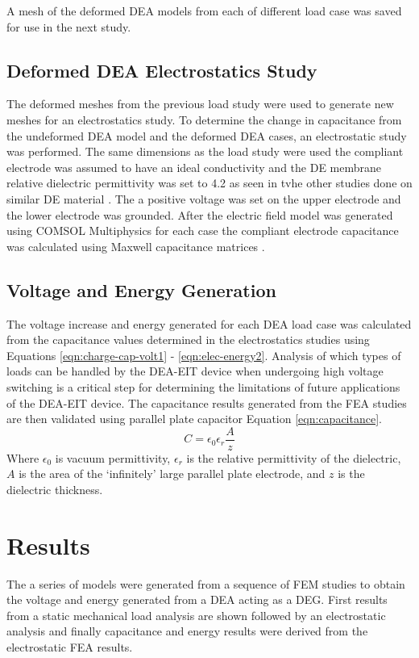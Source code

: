 A mesh of the deformed DEA models from each of different load case was saved for use in the next study.


\subsection{Deformed DEA Electrostatics Study}
The deformed meshes from the previous load study were used to generate new meshes for an electrostatics study. To determine the change in capacitance from the undeformed DEA model and the deformed DEA cases, an electrostatic study was performed. The same dimensions as the load study were used the compliant electrode was assumed to have an ideal conductivity and the DE membrane relative dielectric permittivity was set to 4.2 as seen in tvhe other studies done on similar DE material \cite{Pan2015}. The a positive voltage was set on the upper electrode and the lower electrode was grounded. After the electric field model was generated using COMSOL Multiphysics \cite{COMSOL2022} for each case the compliant electrode capacitance was calculated using Maxwell capacitance matrices \cite{Smolic2021} . 


\subsection{Voltage and Energy Generation}
The voltage increase and energy generated for each DEA load case was calculated from the capacitance values determined in the electrostatics studies using Equations \ref{eqn:charge-cap-volt1} - \ref{eqn:elec-energy2}. Analysis of which types of loads can be handled by the DEA-EIT device when undergoing high voltage switching is a critical step for determining the limitations of future applications of the DEA-EIT device. The capacitance results generated from the FEA studies are then validated using parallel plate capacitor Equation \ref{eqn:capacitance}.
\begin{equation}
	C = \epsilon_0 \epsilon_r \frac{A}{z}
	\label{eqn:capacitance}
\end{equation}
Where $\epsilon_0$ is vacuum permittivity, $\epsilon_r$ is the relative permittivity of the dielectric, $A$ is the area of the `infinitely' large parallel plate electrode, and $z$ is the dielectric thickness.


\section{Results}
\label{sec:results}
The a series of models were generated from a sequence of FEM studies to obtain the voltage and energy generated from a DEA acting as a DEG. First results from a static mechanical load analysis are shown followed by an electrostatic analysis and finally capacitance and energy results were derived from the electrostatic FEA results.


